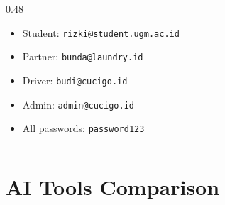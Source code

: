 \documentclass[aspectratio=169,professionalfonts,10pt]{beamer}
\begin{document}
\begin{frame}
\begin{columns}[T]
\begin{column}{0.48\textwidth}
            \vspace{0.3em}

            \begin{tcolorbox}[colback=cucigoCoral!10,colframe=cucigoCoral,title=\small Seed Credentials]
                \begin{itemize}\setlength{\itemsep}{0pt}
                    \item Student: \texttt{rizki@student.ugm.ac.id}
                    \item Partner: \texttt{bunda@laundry.id}
                    \item Driver: \texttt{budi@cucigo.id}
                    \item Admin: \texttt{admin@cucigo.id}
                    \item All passwords: \texttt{password123}
                \end{itemize}
            \end{tcolorbox}
        \end{column}
    \end{columns}
\end{frame}

\section{AI Tools Comparison}
\end{document}
